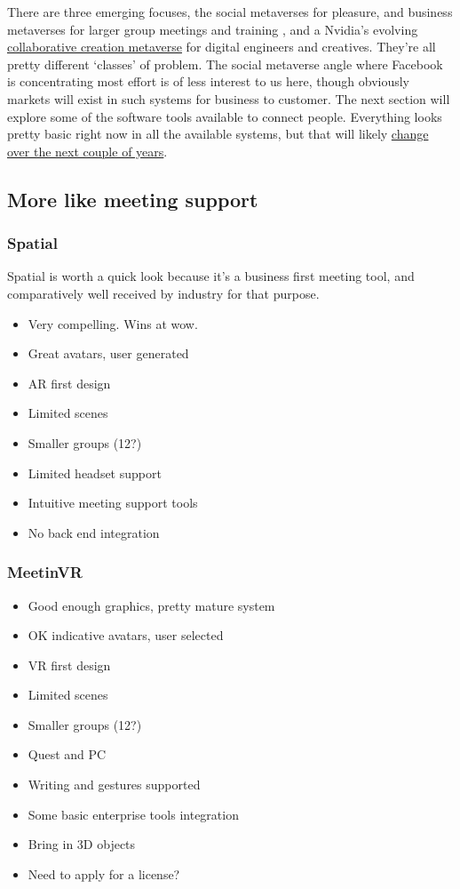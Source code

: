 There are three emerging focuses, the social metaverses for pleasure, and business metaverses for larger group meetings and training \cite{heiphetz2010training, aldrich2005learning}, and a Nvidia's evolving \href{https://blogs.nvidia.com/blog/2022/08/09/omniverse-siggraph/}{collaborative creation metaverse} for digital engineers and creatives. They're all pretty different `classes' of problem. The social metaverse angle where Facebook is concentrating most effort is of less interest to us here, though obviously markets will exist in such systems for business to customer. The next section will explore some of the software tools available to connect people. Everything looks pretty basic right now in all the available systems, but that will likely \href{https://www.youtube.com/watch?v=cRLnR4Kot2M}{change over the next couple of years}.
\subsection{More like meeting support}
\subsubsection{Spatial}
Spatial is worth a quick look because it's a business first meeting tool, and comparatively well received by industry for that purpose.
\begin{itemize}
\item Very compelling. Wins at wow.
\item Great avatars, user generated
\item AR first design
\item Limited scenes
\item Smaller groups (12?)
\item Limited headset support
\item Intuitive meeting support tools
\item No back end integration
\end{itemize}
\subsubsection{MeetinVR}
\begin{itemize}
\item Good enough graphics, pretty mature system
\item OK indicative avatars, user selected
\item VR first design
\item Limited scenes
\item Smaller groups (12?)
\item Quest and PC
\item Writing and gestures supported
\item Some basic enterprise tools integration
\item Bring in 3D objects
\item Need to apply for a license?
\end{itemize}
